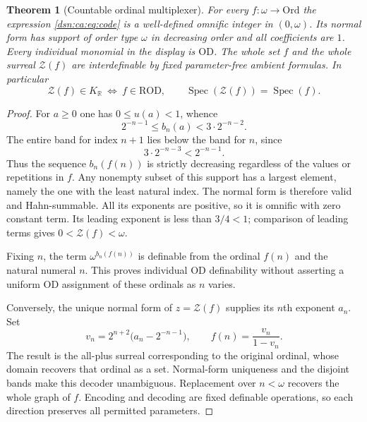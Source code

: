 \documentclass[11pt,a4paper]{article}
\numberwithin{equation}{section}
\newtheorem{theorem}{Theorem}[section]
\theoremstyle{definition}
\theoremstyle{remark}
\newcommand{\Ord}{\mathrm{Ord}}
\newcommand{\OD}{\mathrm{OD}}
\newcommand{\R}{\mathbb R}
\newcommand{\ROD}{\mathrm{ROD}}
\newcommand{\KR}{K_{\R}}
\newcommand{\Zc}{\mathcal Z}
\newcommand{\Spec}{\operatorname{Spec}}
\begin{document}
\begin{theorem}[Countable ordinal multiplexer]\label{dsn:ca:thm:code}
For every $f:\omega\to\Ord$ the expression \eqref{dsn:ca:eq:code} is a
well-defined omnific integer in $(0,\omega)$. Its normal form has
support of order type $\omega$ in decreasing order and all coefficients
are $1$. Every individual monomial in the display is $\OD$.
The whole set $f$ and the whole surreal $\Zc(f)$ are interdefinable
by fixed parameter-free ambient formulas. In particular
\begin{equation}\label{dsn:ca:eq:codeiff}
 \Zc(f)\in\KR\ \Longleftrightarrow\ f\in\ROD,
 \qquad \Spec(\Zc(f))=\Spec(f).
\end{equation}
\end{theorem}
\begin{proof}
For $a\ge0$ one has $0\le u(a)<1$, whence
\begin{equation}\label{dsn:ca:eq:bounds}
 2^{-n-1}\le b_n(a)<3\cdot2^{-n-2}.
\end{equation}
The entire band for index $n+1$ lies below the band for $n$, since
\[
 3\cdot2^{-n-3}<2^{-n-1}.
\]
Thus the sequence $b_n(f(n))$ is strictly decreasing regardless of the
values or repetitions in $f$. Any nonempty subset of this support has
a largest element, namely the one with the least natural index. The
normal form is therefore valid and Hahn-summable. All its exponents
are positive, so it is omnific with zero constant term. Its leading
exponent is less than $3/4<1$; comparison of leading terms gives
$0<\Zc(f)<\omega$.

Fixing $n$, the term $\omega^{b_n(f(n))}$ is definable from the ordinal
$f(n)$ and the natural numeral $n$. This proves individual $\OD$
definability without asserting a uniform $\OD$ assignment of these
ordinals as $n$ varies.

Conversely, the unique normal form of $z=\Zc(f)$ supplies its $n$th
exponent $a_n$. Set
\begin{equation}\label{dsn:ca:eq:decode}
 v_n=2^{n+2}\bigl(a_n-2^{-n-1}\bigr),\qquad
 f(n)=\frac{v_n}{1-v_n}.
\end{equation}
The result is the all-plus surreal corresponding to the original
ordinal, whose domain recovers that ordinal as a set. Normal-form
uniqueness and the disjoint bands make this decoder unambiguous.
Replacement over $n<\omega$ recovers the whole graph of $f$.
Encoding and decoding are fixed definable operations, so each direction
preserves all permitted parameters.
\end{proof}
\end{document}
